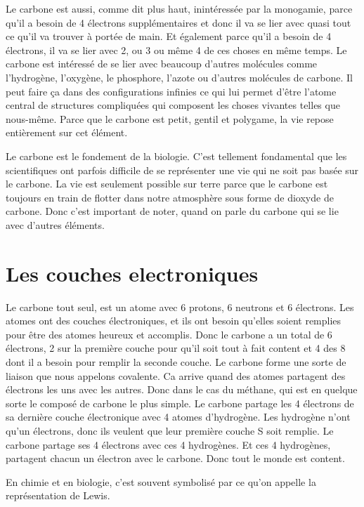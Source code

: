 Le carbone est aussi, comme dit plus haut, inintéressée par la
monogamie, parce qu'il a besoin de 4 électrons supplémentaires et donc
il va se lier avec quasi tout ce qu'il va trouver à portée de main. Et
également parce qu'il a besoin de 4 électrons, il va se lier avec 2, ou
3 ou même 4 de ces choses en même temps. Le carbone est intéressé de se
lier avec beaucoup d'autres molécules comme l'hydrogène, l'oxygène, le
phosphore, l'azote ou d'autres molécules de carbone. Il peut faire ça
dans des configurations infinies ce qui lui permet d'être l'atome
central de structures compliquées qui composent les choses vivantes
telles que nous-même. Parce que le carbone est petit, gentil et
polygame, la vie repose entièrement sur cet élément.

Le carbone est le fondement de la biologie. C'est tellement fondamental
que les scientifiques ont parfois difficile de se représenter une vie
qui ne soit pas basée sur le carbone. La vie est seulement possible sur
terre parce que le carbone est toujours en train de flotter dans notre
atmosphère sous forme de dioxyde de carbone. Donc c'est important de
noter, quand on parle du carbone qui se lie avec d'autres éléments.

\hypertarget{les-couches-electroniques}{%
\section{Les couches electroniques}\label{les-couches-electroniques}}

Le carbone tout seul, est un atome avec 6 protons, 6 neutrons et 6
électrons. Les atomes ont des couches électroniques, et ils ont besoin
qu'elles soient remplies pour être des atomes heureux et accomplis. Donc
le carbone a un total de 6 électrons, 2 sur la première couche pour
qu'il soit tout à fait content et 4 des 8 dont il a besoin pour remplir
la seconde couche. Le carbone forme une sorte de liaison que nous
appelons covalente. Ca arrive quand des atomes partagent des électrons
les uns avec les autres. Donc dans le cas du méthane, qui est en quelque
sorte le composé de carbone le plus simple. Le carbone partage les 4
électrons de sa dernière couche électronique avec 4 atomes d'hydrogène.
Les hydrogène n'ont qu'un électrons, donc ils veulent que leur première
couche S soit remplie. Le carbone partage ses 4 électrons avec ces 4
hydrogènes. Et ces 4 hydrogènes, partagent chacun un électron avec le
carbone. Donc tout le monde est content.

En chimie et en biologie, c'est souvent symbolisé par ce qu'on appelle
la représentation de Lewis.


